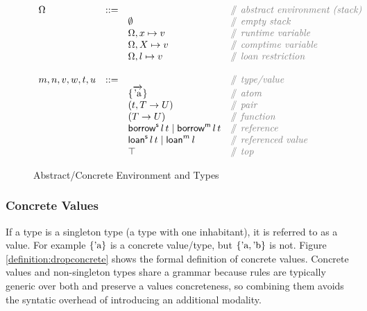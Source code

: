 \documentclass[12pt,twoside]{report}
\begin{document}
\begin{figure}
  \arraycolsep=1pt %
  \centering

  \vspace{-2ex} %
  \[
  \begin{array}[t]{llll}
    \Omega & ::= & & \ocomment{abstract environment (stack)} \\
    && \emptyset & \ocomment{empty stack} \\
    && \Omega, x \mapsto v & \ocomment{runtime variable} \\
    && \Omega, X \mapsto v & \ocomment{comptime variable} \\
    && \Omega, l \mapsto v & \ocomment{loan restriction} \\
    \\
    m, n, v, w, t, u & ::= & & \ocomment{type/value} \\
    && \{\overrightarrow{\atom{a}}\} & \ocomment{atom} \\
    && (t, T \rightarrow U) & \ocomment{pair} \\
    && (T \rightarrow U) & \ocomment{function} \\
    && \borrows{l}{t} \mid \borrowm{l}{t} & \ocomment{reference} \\
    && \loans{l}{t} \mid \loanm{l} & \ocomment{referenced value} \\
    && \top & \ocomment{top} \\
  \end{array} %
  \]
\caption{Abstract/Concrete Environment and Types} %
\label{fig:env} %
\end{figure} %

\subsubsection{Concrete Values}
If a type is a singleton type (a type with one inhabitant), it is referred to as a value. For example $\{ \text{'a} \}$ is a concrete value/type, but $\{ \text{'a}, \text{'b} \}$ is not. Figure \ref{definition:dropconcrete} shows the formal definition of concrete values. Concrete values and non-singleton types share a grammar because rules are typically generic over both and preserve a values concreteness, so combining them avoids the syntatic overhead of introducing an additional modality.
\end{document}
